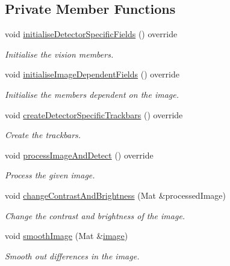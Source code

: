 \subsection*{Private Member Functions}
\begin{DoxyCompactItemize}
\item 
void \hyperlink{classmultiscale_1_1analysis_1_1RegionDetector_aee6bb117ea0ef98b8e333ac33d17962c}{initialise\-Detector\-Specific\-Fields} () override
\begin{DoxyCompactList}\small\item\em Initialise the vision members. \end{DoxyCompactList}\item 
void \hyperlink{classmultiscale_1_1analysis_1_1RegionDetector_a3c14a7cc6f0282cc031a4a40704d474e}{initialise\-Image\-Dependent\-Fields} () override
\begin{DoxyCompactList}\small\item\em Initialise the members dependent on the image. \end{DoxyCompactList}\item 
void \hyperlink{classmultiscale_1_1analysis_1_1RegionDetector_a904af350ef7e988bb10970cac7b9491a}{create\-Detector\-Specific\-Trackbars} () override
\begin{DoxyCompactList}\small\item\em Create the trackbars. \end{DoxyCompactList}\item 
void \hyperlink{classmultiscale_1_1analysis_1_1RegionDetector_ae47319444db34d72d4316f49f965b69d}{process\-Image\-And\-Detect} () override
\begin{DoxyCompactList}\small\item\em Process the given image. \end{DoxyCompactList}\item 
void \hyperlink{classmultiscale_1_1analysis_1_1RegionDetector_a92260dc64fb1de8f72df3a7bd44e171d}{change\-Contrast\-And\-Brightness} (Mat \&processed\-Image)
\begin{DoxyCompactList}\small\item\em Change the contrast and brightness of the image. \end{DoxyCompactList}\item 
void \hyperlink{classmultiscale_1_1analysis_1_1RegionDetector_a895f12ad46f2e0d1db45637a5935c2b5}{smooth\-Image} (Mat \&\hyperlink{classmultiscale_1_1analysis_1_1Detector_a523830a6cfe409694ce8327c3c736fbd}{image})
\begin{DoxyCompactList}\small\item\em Smooth out differences in the image. \end{DoxyCompactList}\item 

\end{DoxyCompactItemize}

